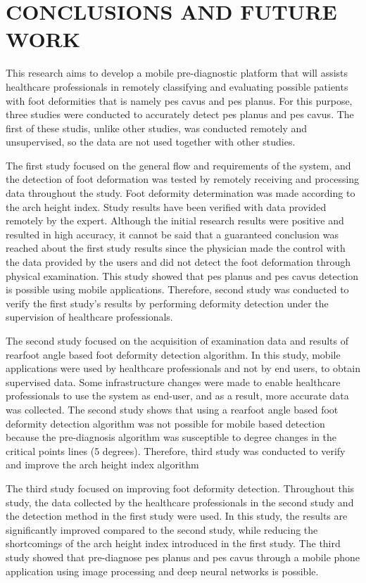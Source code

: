 \chapter{CONCLUSIONS AND FUTURE WORK}\label{chp:ConclusionsAndFutureWork}

This research aims to develop a mobile pre-diagnostic platform that will assists healthcare professionals in remotely classifying and evaluating possible patients with foot deformities that is namely pes cavus and pes planus. For this purpose, three studies were conducted to accurately detect pes planus and pes cavus. The first of these studis, unlike other studies, was conducted remotely and unsupervised, so the data are not used together with other studies.

The first study focused on the general flow and requirements of the system, and the detection of foot deformation was tested by remotely receiving and processing data throughout the study. Foot deformity determination was made according to the arch height index. Study results have been verified with data provided remotely by the expert. Although the initial research results were positive and resulted in high accuracy, it cannot be said that a guaranteed conclusion was reached about the first study results since the physician made the control with the data provided by the users and did not detect the foot deformation through physical examination. This study showed that pes planus and pes cavus detection is possible using mobile applications. Therefore, second study was conducted to verify the first study’s results by performing deformity detection under the supervision of healthcare professionals.

The second study focused on the acquisition of examination data and results of rearfoot angle based foot deformity detection algorithm. In this study, mobile applications were used by healthcare professionals and not by end users, to obtain supervised data. Some infrastructure changes were made to enable healthcare professionals to use the system as end-user, and as a result, more accurate data was collected. The second study shows that using a rearfoot angle based foot deformity detection algorithm was not possible for mobile based detection because the pre-diagnosis algorithm was susceptible to degree changes in the critical points lines (5 degrees). Therefore, third study was conducted to verify and improve the  arch height index algorithm

The third study focused on improving foot deformity detection. Throughout this study, the data collected by the healthcare professionals in the second study and the detection method in the first study were used. In this study, the results are significantly improved compared to the second study, while reducing the shortcomings of the arch height index introduced in the first study. The third study showed that pre-diagnose pes planus and pes cavus through a mobile phone application using image processing and deep neural networks is possible.

